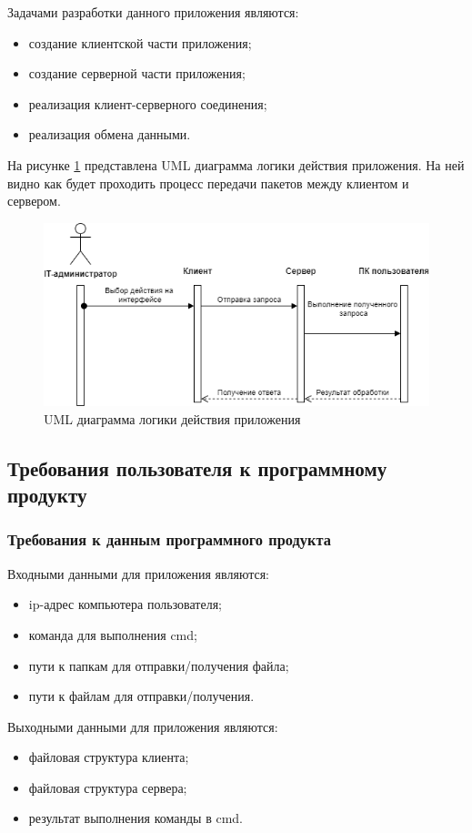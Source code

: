 Задачами разработки данного приложения являются:
\begin{itemize}
	\item создание клиентской части приложения;
	\item создание серверной части приложения;
	\item реализация клиент-серверного соединения;
	\item реализация обмена данными.
\end{itemize}

На рисунке \ref{fig:-action_diagramma} представлена UML диаграмма логики действия приложения. На ней видно как будет проходить процесс передачи пакетов между клиентом и сервером.
\begin{figure}
	\centering
	\includegraphics[width=1\linewidth]{"images/UML"}
	\caption{UML диаграмма логики действия приложения}
	\label{fig:-action_diagramma}
\end{figure}

\subsection{Требования пользователя к программному продукту}
\subsubsection{Требования к данным программного продукта}
Входными данными для приложения являются:
\begin{itemize}
	\item ip-адрес компьютера пользователя;
	\item команда для выполнения cmd;
	\item пути к папкам для отправки/получения файла;
	\item пути к файлам для отправки/получения.
\end{itemize}

Выходными данными для приложения являются:
\begin{itemize}
	\item файловая структура клиента;
	\item файловая структура сервера;
	\item результат выполнения команды в cmd.
\end{itemize}

